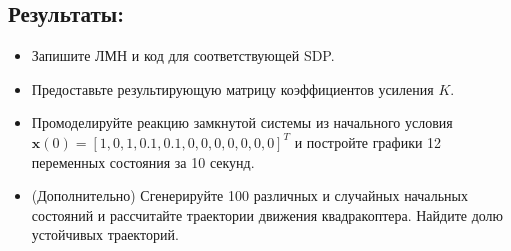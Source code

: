 \documentclass[8pt]{article}
\begin{document}
    
\subsection*{Результаты:}
    \begin{itemize}
        \item Запишите ЛМН и код для соответствующей SDP.
        \item Предоставьте результирующую матрицу коэффициентов усиления \(K\).
        \item Промоделируйте реакцию замкнутой системы из начального условия \(\mathbf{x}(0) = [1, 0, 1, 0.1, 0.1, 0, 0, 0, 0, 0, 0, 0]^T\) и постройте графики 12 переменных состояния за 10 секунд.
        \item (Дополнительно) Сгенерируйте 100 различных и случайных начальных состояний и рассчитайте траектории движения квадракоптера. Найдите долю устойчивых траекторий.
\end{itemize}
\end{document}
